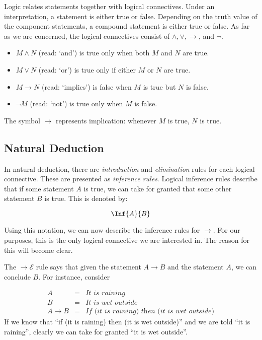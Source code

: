   Logic relates statements together with logical connectives.
  Under an interpretation, a statement is either true or false.
  Depending on the truth value of the component statements, a compound statement is either true or false.
  As far as we are concerned, the logical connectives consist of $\land, \lor, \to$, and $\neg$.
  \begin{itemize}
    \item $M \land N$ (read: `and') is true only when both $M$ and $N$ are true.
    \item $M \lor N$ (read: `or') is true only if either $M$ or $N$ are true. 
    \item $M \to N$ (read: `implies') is false when $M$ is true but $N$ is false.
    \item $\neg M$ (read: `not') is true only when $M$ is false.
  \end{itemize}
  The symbol $\to$ represents implication: whenever $M$ is true, $N$ is true.
  
  \subsection{Natural Deduction}
  
  In natural deduction, there are \emph{introduction} and \emph{elimination} rules for each logical connective.
  These are presented as \emph{inference rules}.
  Logical inference rules describe that if some statement $A$ is true,
  we can take for granted that some other statement $B$ is true.
  This is denoted by:
  
  \[
    \Inf{A}{B} 
  \]
  
  Using this notation, we can now describe the inference rules for $\to$.
  For our purposes, this is the only logical connective we are interested in.
  The reason for this will become clear.
  
  
  The $\to\mathcal{E}$ rule says that given the statement $A \to B$ and the statement $A$,
  we can conclude $B$.
  For instance, consider 
 
  \[
  \begin{array}{lcl}
    A & = & \textit{It is raining} \\
    B & = & \textit{It is wet outside} \\
    A \to B & = & \textit{If (it is raining) then (it is wet outside)}
  \end{array}
  \]
  If we know that ``if (it is raining) then (it is wet outside)'' and we are told ``it is raining'',
  clearly we can take for granted ``it is wet outside''.
  
